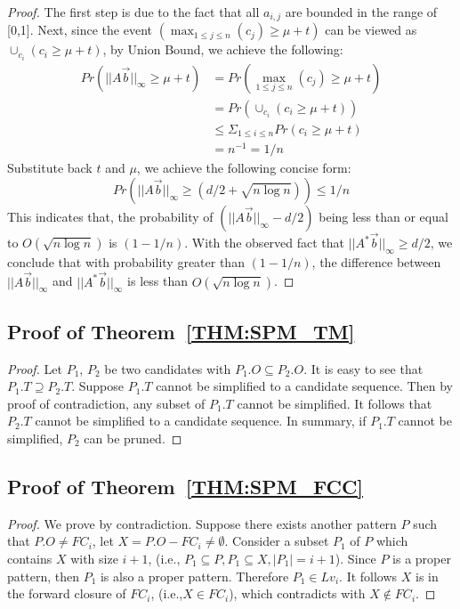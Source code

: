 \begin{proof}
The first step is due to the fact that all $a_{i,j}$ are bounded in the range of [0,1]. 
Next, since the event $(\max_{1 \leq j \leq n}(c_j) \geq \mu + t)$ can be viewed as
$\cup_{c_i} (c_i \geq \mu + t )$, by Union Bound, we achieve the following:
\begin{equation*}
\begin{split}
	Pr(||A\vec{b}||_\infty \geq \mu + t) &=Pr(\max_{1\leq j \leq n}(c_j) \geq \mu + t)  \\
		& = Pr(\cup_{c_i} (c_i \geq \mu + t )) \\
		&\leq \Sigma_{1 \leq i \leq n} Pr(c_i \geq \mu + t) \\
		& = n^{-1} = 1/n
\end{split}
\end{equation*}
Substitute back $t$ and $\mu$, we achieve the following concise form:
\begin{equation*}
	Pr(||A\vec{b}||_\infty \geq (d/2 + \sqrt{n\log n})) \leq 1/n
\end{equation*}
This indicates that, the probability of $(||A\vec{b}||_\infty-d/2)$ being less than or equal to $ O(\sqrt{n\log n})$ is $(1-1/n)$. With the observed fact that $||A^*\vec{b}||_\infty \geq d/2$, we conclude that
with probability greater than $(1-1/n)$, 
the difference between $||A\vec{b}||_\infty$ and $||A^*\vec{b}||_\infty$ is less than $O(\sqrt{n\log n})$.
\end{proof}

\subsection{Proof of Theorem~\ref{THM:SPM_TM}}
\begin{proof}
Let $P_1$, $P_2$ be two candidates with $P_1.O \subseteq P_2.O$. It is easy to see that $P_1.T \supseteq P_2.T$.
Suppose $P_1.T$ cannot be simplified to a candidate sequence. Then
by proof of contradiction, any subset of $P_1.T$ cannot
be simplified. It follows that $P_2.T$ cannot be simplified to a candidate sequence. 
In summary, if $P_1.T$ cannot be simplified, $P_2$ can be pruned. 
\end{proof}

\subsection{Proof of Theorem~\ref{THM:SPM_FCC}}
\begin{proof}
We prove by contradiction. Suppose there exists another pattern $P$ such that $P.O \neq FC_i$, 
let $X=P.O - FC_i \neq \emptyset$. Consider a subset $P_1$ of $P$ which contains $X$ with size $i+1$, 
(i.e., $P_1 \subseteq P, P_1\subseteq X, |P_1|=i+1$). Since $P$ is a proper pattern, 
then $P_1$ is also a proper pattern. Therefore $P_1 \in Lv_i$.
It follows $X$ is in the forward closure of $FC_i$, (i.e.,$X \in FC_i$), which contradicts with $X\notin FC_i$.
\end{proof}